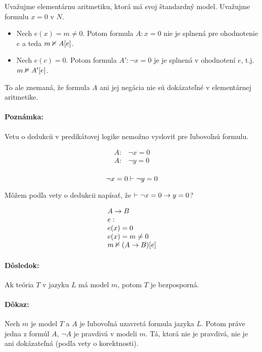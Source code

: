 \begin{priklad}
    Uvažujme elementárnu aritmetiku, ktorá má svoj štandardný
    model. Uvažujme formulu $x=0$ v $N$. 

    \begin{itemize}
        \item Nech $e(x) = m \neq 0$. Potom formula $A: x=0$ nie je
        splnená pre ohodnotenie $e$ a teda $m \nvDash A[e]$.
        \item Nech $e(c) = 0$. Potom formula $A': \neg x=0$ je je
        splnená v ohodnotení $e$, t.j. $m \nvDash A'[e]$.
    \end{itemize}
    To ale znemaná, že formula $A$ ani jej negácia
    nie sú dokázateľné v elementárnej aritmetike.
\end{priklad}


\paragraph{Poznámka:} Vetu o dedukcii v predikátovej logike nemožno vysloviť pre
ľubovoľnú formulu.

$$ 
\begin{array}{ll}
	A: & \neg x=0 \\
	A: & \neg y=0 \\
\end{array}
$$

$$
	\neg x=0 \vdash \neg y=0
$$

Môžem podľa vety o dedukcii napísať, že $ \vdash \neg x=0 \rightarrow y=0$?

$$
\begin{array}{l}
	A \rightarrow B \\
	e:	\\
	e(x)=0	\\
	e(x)= m \neq 0	\\
	m \nvDash (A \rightarrow B)[e]	\\
\end{array}
$$

\paragraph{Dôsledok:} Ak teória $T$ v jazyku $L$ má model $m$, potom $T$ je
bezposporná.
\paragraph{Dôkaz:} Nech $m$ je model $T$ a $A$ je ľubovoľná uzavretá formula
jazyka $L$. Potom práve jedna z formúl $A$, $\neg A$ je pravdivá v modeli $m$.
Tá, ktorá nie je pravdivá, nie je ani dokázateľná (podľa vety o korektnosti).

